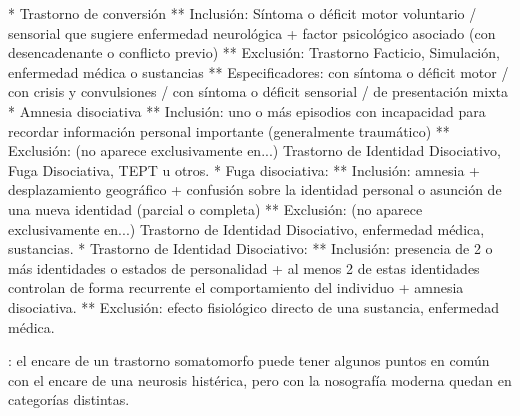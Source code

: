 * Trastorno de conversión
** Inclusión: Síntoma o déficit motor voluntario / sensorial que sugiere enfermedad neurológica + factor psicológico asociado (con desencadenante o conflicto previo)
** Exclusión: Trastorno Facticio, Simulación, enfermedad médica o sustancias
** Especificadores: con síntoma o déficit motor / con crisis y convulsiones / con síntoma o déficit sensorial / de presentación mixta
* Amnesia disociativa
** Inclusión: uno o más episodios con incapacidad para recordar información personal importante (generalmente traumático)
** Exclusión: (no aparece exclusivamente en...) Trastorno de Identidad Disociativo, Fuga Disociativa, TEPT u otros.
* Fuga disociativa:
** Inclusión: amnesia + desplazamiento geográfico + confusión sobre la identidad personal o asunción de una nueva identidad (parcial o completa)
** Exclusión: (no aparece exclusivamente en...) Trastorno de Identidad Disociativo, enfermedad médica, sustancias.
* Trastorno de Identidad Disociativo:
** Inclusión: presencia de 2 o más identidades o estados de personalidad + al menos 2 de estas identidades controlan de forma recurrente el comportamiento del individuo + amnesia disociativa.
** Exclusión: efecto fisiológico directo de una sustancia, enfermedad médica.

\faTrafficLight: el encare de un trastorno somatomorfo puede tener algunos puntos en común con el encare de una neurosis histérica, pero con la nosografía moderna quedan en categorías distintas.
